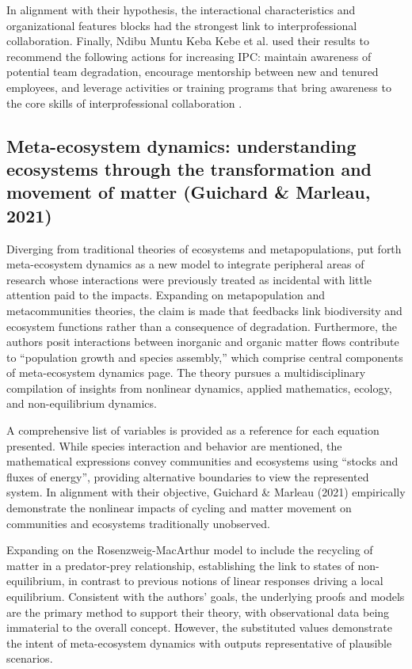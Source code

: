\documentclass[sn-nature]{sn-jnl}%
\theoremstyle{thmstyleone}%
\theoremstyle{thmstyletwo}%
\theoremstyle{thmstylethree}%
\begin{document}
In alignment with their hypothesis, the interactional characteristics and organizational features blocks had the strongest link to interprofessional collaboration\cite{ndibu_muntu_keba_kebe_variables_2019}. Finally, Ndibu Muntu Keba Kebe et al. used their results to recommend the following actions for increasing IPC: maintain awareness of potential team degradation, encourage mentorship between new and tenured employees, and leverage activities or training programs that bring awareness to the core skills of interprofessional collaboration \cite{ndibu_muntu_keba_kebe_variables_2019}.

\subsection{Meta-ecosystem dynamics: understanding ecosystems through the transformation and movement of matter (Guichard \& Marleau, 2021)\cite{guichard_meta-ecosystem_2021}}

Diverging from traditional theories of ecosystems and metapopulations, \citet{guichard_meta-ecosystem_2021} put forth meta-ecosystem dynamics as a new model to integrate peripheral areas of research whose interactions were previously treated as incidental with little attention paid to the impacts\cite{guichard_meta-ecosystem_2021}. Expanding on metapopulation and metacommunities theories, the claim is made that feedbacks link biodiversity and ecosystem functions rather than a consequence of degradation. Furthermore, the authors posit interactions between inorganic and organic matter flows contribute to “population growth and species assembly,”\citep[p. v]{guichard_meta-ecosystem_2021} which comprise central components of meta-ecosystem dynamics page.
The theory pursues a multidisciplinary compilation of insights from nonlinear dynamics, applied mathematics, ecology, and non-equilibrium dynamics.

A comprehensive list of variables is provided as a reference for each equation presented. While species interaction and behavior are mentioned, the mathematical expressions convey communities and ecosystems using “stocks and fluxes of energy”\citep[p. 3]{guichard_meta-ecosystem_2021}, providing alternative boundaries to view the represented system. In alignment with their objective, Guichard \& Marleau (2021) empirically demonstrate the nonlinear impacts of cycling and matter movement on communities and ecosystems traditionally unobserved.

Expanding on the Rosenzweig-MacArthur model to include the recycling of matter in a predator-prey relationship, establishing the link to states of non-equilibrium, in contrast to previous notions of linear responses driving a local equilibrium\cite{guichard_meta-ecosystem_2021}. Consistent with the authors’ goals, the underlying proofs and models are the primary method to support their theory, with observational data being immaterial to the overall concept. However, the substituted values demonstrate the intent of meta-ecosystem dynamics with outputs representative of plausible scenarios\cite{guichard_meta-ecosystem_2021}.
\end{document}

